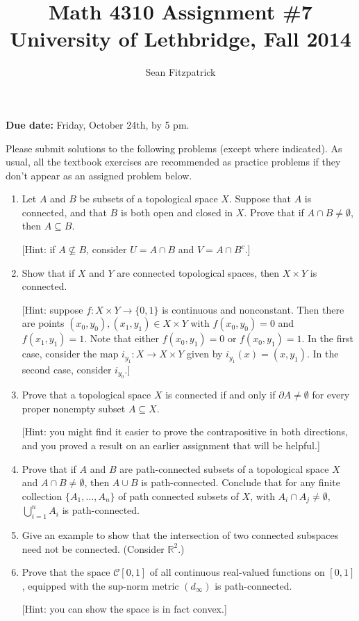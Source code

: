 \documentclass[letterpaper,12pt]{article}
\title{Math 4310 Assignment \#7\\University of Lethbridge, Fall 2014}
\author{Sean Fitzpatrick}
\newcommand{\R}{\mathbb{R}}
\begin{document}
 \maketitle

{\bf Due date:} Friday, October 24th, by 5 pm.

\bigskip

Please submit solutions to the following problems (except where indicated). As usual, all the textbook exercises are recommended as practice problems if they don't appear as an assigned problem below.

\begin{enumerate}
\item Let $A$ and $B$ be subsets of a topological space $X$. Suppose that $A$ is connected, and that $B$ is both open and closed in $X$. Prove that if $A\cap B\neq\emptyset$, then $A\subseteq B$.

[Hint: if $A\nsubseteq B$, consider $U=A\cap B$ and $V=A\cap B^c$.]
\item Show that if $X$ and $Y$ are connected topological spaces, then $X\times Y$ is connected.

[Hint: suppose $f:X\times Y\to\{0,1\}$ is continuous and nonconstant. Then there are points $(x_0,y_0),(x_1,y_1)\in X\times Y$ with $f(x_0,y_0)=0$ and $f(x_1,y_1)=1$. Note that either $f(x_0,y_1)=0$ or $f(x_0,y_1)=1$. In the first case, consider the map $i_{y_1}:X\to X\times Y$ given by $i_{y_1}(x) = (x,y_1)$. In the second case, consider $i_{y_0}$.]
\item Prove that a topological space $X$ is connected if and only if $\partial A\neq \emptyset$ for every proper nonempty subset $A\subseteq X$.

[Hint: you might find it easier to prove the contrapositive in both directions, and you proved a result on an earlier assignment that will be helpful.]
\item Prove that if $A$ and $B$ are path-connected subsets of a topological space $X$ and $A\cap B\neq \emptyset$, then $A\cup B$ is path-connected. Conclude that for any finite collection $\{A_1,\ldots, A_n\}$ of path connected subsets of $X$, with $A_i\cap A_j\neq \emptyset$,  $\bigcup_{i=1}^nA_i$ is path-connected.

\item Give an example to show that the intersection of two connected subspaces need not be connected. (Consider $\R^2$.)
\item Prove that the space $\mathcal{C}[0,1]$ of all continuous real-valued functions on $[0,1]$, equipped with the sup-norm metric $(d_\infty)$ is path-connected.

[Hint: you can show the space is in fact convex.]
\end{enumerate}
\end{document}
